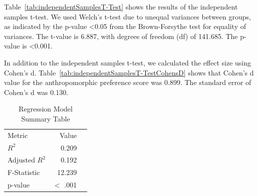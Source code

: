 \documentclass[conference]{IEEEtran}
\begin{document}
Table~\ref{tab:independentSamplesT-Test} shows the results of the independent samples t-test. We used Welch’s t-test due to unequal variances between groups, as indicated by the p-value \textless 0.05 from the Brown-Forsythe test for equality of variances. The t-value is 6.887, with degrees of freedom (df) of 141.685. The p-value is \textless 0.001.               

\begin{table}[h]
    \centering
    \caption{Independent Samples T-Test with Effect Size}
    \label{tab:independentSamplesT-TestCohensD}
\end{table}

In addition to the independent samples t-test, we calculated the effect size using Cohen’s d. Table~\ref{tab:independentSamplesT-TestCohensD} shows that Cohen’s d value for the anthropomorphic preference score was 0.899. The standard error of Cohen’s d was 0.130.

\begin{table}[h]
    \centering
    \caption{Regression Coefficients Table}
    \label{tab:regressionCoefficientsTable}
\end{table}

\begin{table}[H]
    \centering
    \caption{Regression Model Summary Table}
    \label{tab:regressionModelSummaryTable}
        \begin{tabular}{lrr}
            \toprule
            Metric & Value  \\
            \cmidrule[0.4pt]{1-2}
            $R^2$ & 0.209 \\
            Adjusted $R^2$  & 0.192 \\
            F-Statistic & 12.239 \\
            p-value & $<$ .001 \\
            \bottomrule
        \end{tabular}
\end{table}
\end{document}
